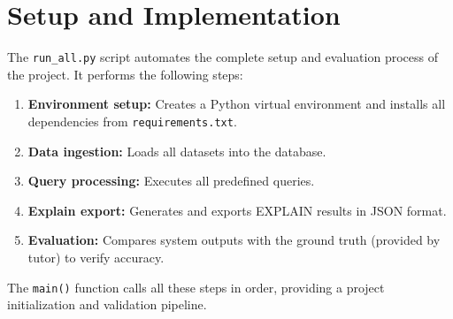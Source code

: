 \documentclass[11pt,a4paper]{article}
\begin{document}
\section{Setup and Implementation}
The \texttt{run_all.py} script automates the complete setup and evaluation process of the project. 
It performs the following steps:

\begin{enumerate}
    \item \textbf{Environment setup:} Creates a Python virtual environment and installs all dependencies from \texttt{requirements.txt}.
    \item \textbf{Data ingestion:} Loads all datasets into the database.
    \item \textbf{Query processing:} Executes all predefined queries.
    \item \textbf{Explain export:} Generates and exports EXPLAIN results in JSON format.
    \item \textbf{Evaluation:} Compares system outputs with the ground truth (provided by tutor) to verify accuracy.
\end{enumerate}

The \texttt{main()} function calls all these steps in order, providing a project initialization and validation pipeline.
\end{document}
